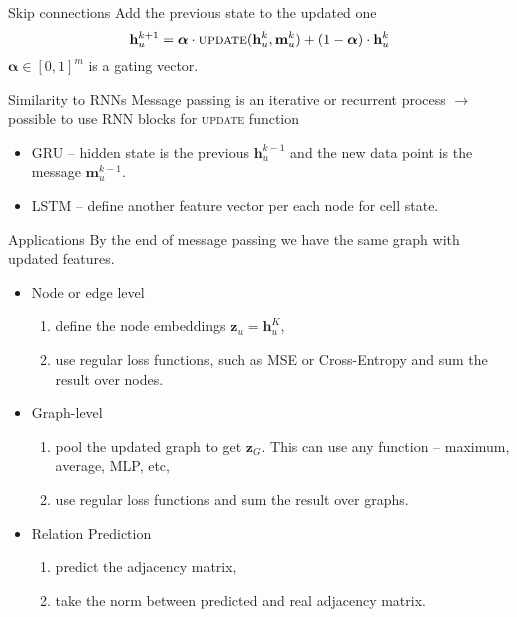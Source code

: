 \documentclass{beamer}
\begin{document}
\begin{frame}{Skip connections}
    Add the previous state to the updated one
    \begin{equation*}
        \mathbf{h}_u^{k+1} = \bm{\alpha}\cdot \textsc{update}(\mathbf{h}_u^k, \mathbf{m}_u^k) + (1-\bm{\alpha}) \cdot \mathbf{h}_u^k
    \end{equation*}
    $\bm{\alpha} \in [0, 1]^m$ is a gating vector.
\end{frame}

\begin{frame}{Similarity to RNNs}
    Message passing is an iterative or recurrent process $\rightarrow$ possible to use RNN blocks for \textsc{update} function
    \begin{itemize}
        \item GRU -- hidden state is the previous $\mathbf{h}_u^{k-1}$ and the new data point is the message $\mathbf{m}_u^{k-1}$.
        \item LSTM -- define another feature vector per each node for cell state.
    \end{itemize}
\end{frame}

\begin{frame}{Applications}
    By the end of message passing we have the same graph with updated features.

    \begin{itemize}
        \item Node or edge level
        \begin{enumerate}
            \item define the node embeddings $\mathbf{z}_u = \mathbf{h}_u^K$,
            \item use regular loss functions, such as MSE or Cross-Entropy and sum the result over nodes.
        \end{enumerate}
        \item Graph-level
        \begin{enumerate}
            \item pool the updated graph to get $\mathbf{z}_G$. This can use any function -- maximum, average, MLP, etc,
            \item use regular loss functions and sum the result over graphs.
        \end{enumerate}
        \item Relation Prediction
        \begin{enumerate}
            \item predict the adjacency matrix,
            \item take the norm between predicted and real adjacency matrix.
        \end{enumerate}
    \end{itemize}
\end{frame}
\end{document}
